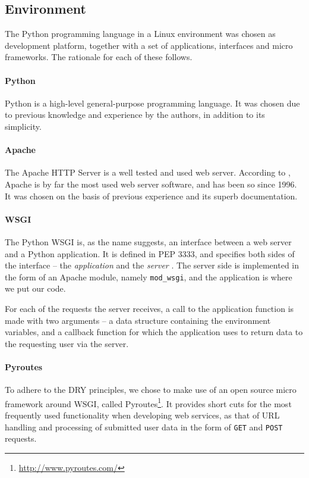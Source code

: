 \documentclass[pdftex,english,10pt,b5paper,twoside]{book}
\begin{document}
\subsection{Environment}

The Python programming language in a Linux environment was chosen as development
platform, together with a set of applications, interfaces and micro frameworks.
The rationale for each of these follows.

\paragraph{Python} Python is a high-level general-purpose programming language.
It was chosen due to previous knowledge and experience by the
authors, in addition to its simplicity.

\paragraph{Apache} The Apache HTTP Server is a well tested and used web
server. According to \citet{netcraft}, Apache is by far the most used web server
software, and has been so since 1996. It was chosen on the basis of previous
experience and its superb documentation.

\paragraph{\acs{WSGI}} The Python \ac{WSGI} is, as the name suggests, an
interface between a web server and a Python application. It is defined in
\ac{PEP} 3333, and specifies both sides of the interface -- the
\emph{application} and the \emph{server} \cite{PEP-3333}. The server side is
implemented in the form of an Apache module, namely \texttt{mod\_wsgi}, and the
application is where we put our code.

For each of the requests the server receives, a call
to the application function is made with two arguments -- a data structure
containing the environment variables, and a callback function for which the
application uses to return data to the requesting user via the server.

\paragraph{Pyroutes} To adhere to the \ac{DRY} principles, we chose to make use
of an open source micro framework around \ac{WSGI}, called
Pyroutes\footnote{\url{http://www.pyroutes.com/}}. It provides short cuts for the
most frequently used functionality when developing web services, as that of
\ac{URL} handling and processing of submitted user data in the form of
\texttt{GET} and \texttt{POST} requests.
\end{document}
